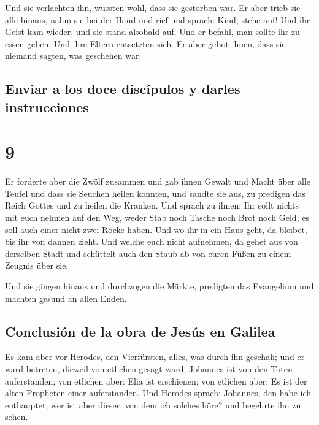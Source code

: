  Und sie verlachten ihn, wussten wohl, dass sie gestorben
war.  Er aber trieb sie alle hinaus, nahm sie bei der
Hand und rief und sprach: Kind, stehe auf!  Und ihr Geist
kam wieder, und sie stand alsobald auf. Und er befahl, man sollte ihr zu
essen geben.  Und ihre Eltern entsetzten sich. Er aber
gebot ihnen, dass sie niemand sagten, was geschehen war.

\hypertarget{enviar-a-los-doce-discuxedpulos-y-darles-instrucciones}{%
\subsection{Enviar a los doce discípulos y darles
instrucciones}\label{enviar-a-los-doce-discuxedpulos-y-darles-instrucciones}}

\hypertarget{section-8}{%
\section{9}\label{section-8}}

 Er forderte aber die Zwölf zusammen und gab ihnen Gewalt
und Macht über alle Teufel und dass sie Seuchen heilen konnten,
 und sandte sie aus, zu predigen das Reich Gottes und zu
heilen die Kranken.  Und sprach zu ihnen: Ihr sollt nichts
mit euch nehmen auf den Weg, weder Stab noch Tasche noch Brot noch Geld;
es soll auch einer nicht zwei Röcke haben.  Und wo ihr in
ein Haus geht, da bleibet, bis ihr von dannen zieht.  Und
welche euch nicht aufnehmen, da gehet aus von derselben Stadt und
schüttelt auch den Staub ab von euren Füßen zu einem Zeugnis über sie.

 Und sie gingen hinaus und durchzogen die Märkte,
predigten das Evangelium und machten gesund an allen Enden.

\hypertarget{conclusiuxf3n-de-la-obra-de-jesuxfas-en-galilea}{%
\subsection{Conclusión de la obra de Jesús en
Galilea}\label{conclusiuxf3n-de-la-obra-de-jesuxfas-en-galilea}}

 Es kam aber vor Herodes, den Vierfürsten, alles, was
durch ihn geschah; und er ward betreten, dieweil von etlichen gesagt
ward; Johannes ist von den Toten auferstanden;  von
etlichen aber: Elia ist erschienen; von etlichen aber: Es ist der alten
Propheten einer auferstanden.  Und Herodes sprach:
Johannes, den habe ich enthauptet; wer ist aber dieser, von dem ich
solches höre? und begehrte ihn zu sehen.

